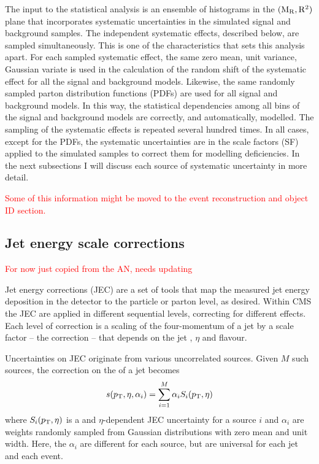 
 
The input to the statistical analysis is an ensemble of histograms in the $(\mathrm{M_R},\mathrm{R^2})$ plane that 
incorporates systematic uncertainties in the simulated signal and background samples.  
The independent systematic effects, described below, are sampled simultaneously. 
This is one of the characteristics that sets this analysis apart. 
For each sampled systematic effect, the same zero mean, unit variance, Gaussian variate is used in
the calculation of the random shift of the systematic effect for all the signal and background
models. Likewise, the same randomly sampled parton distribution functions (PDFs) are used for all
signal and background models. 
In this way, the statistical dependencies among all bins of the signal and background models are
correctly, and automatically, modelled. The sampling of the systematic effects
is repeated several hundred times.  
In all cases, except for the PDFs, the systematic uncertainties are in the scale factors (SF) 
applied to the simulated samples to correct them for modelling deficiencies. 
In the next subsections I will discuss each source of systematic uncertainty in more detail. 

\vspace{1eM}

\textcolor{red}{Some of this information might be moved to the event reconstruction and object
ID section.}

\vspace{1eM}

\subsection{Jet energy scale corrections}  

\textcolor{red}{For now just copied from the AN, needs updating}

Jet energy corrections (JEC) are a set of tools that map the measured jet energy deposition in the
detector to the particle or parton level, as desired. 
Within CMS the JEC are applied in different sequential levels, correcting for different effects.
Each level of correction is a scaling of the four-momentum of a jet by a scale factor -- the
correction -- that depends on the jet \pt, $\eta$ and flavour.  

Uncertainties on JEC originate from various uncorrelated sources.   
Given $M$ such sources, the correction on the \pt of a jet becomes 
\begin{equation}
s(p_{\mathrm{T}}, \eta, \alpha_i) = \sum_{i=1}^M \alpha_i S_i (p_{\mathrm{T}}, \eta)
\end{equation}
where $S_i (p_{\mathrm{T}}, \eta)$ is a \pt and $\eta$-dependent JEC uncertainty for a source $i$ and
$\alpha_i$ are weights randomly sampled from Gaussian distributions with zero mean and unit
width. 
Here, the $\alpha_i$ are different for each source, but are universal for each jet and each event.


